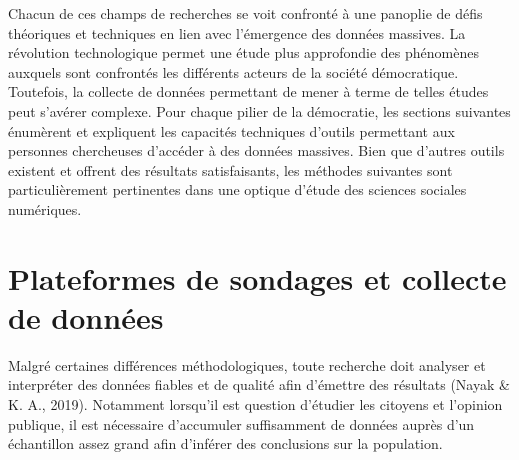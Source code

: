 \documentclass[
  letterpaper,
]{scrbook}
\begin{document}
Chacun de ces champs de recherches se voit confronté à une panoplie de
défis théoriques et techniques en lien avec l'émergence des données
massives. La révolution technologique permet une étude plus approfondie
des phénomènes auxquels sont confrontés les différents acteurs de la
société démocratique. Toutefois, la collecte de données permettant de
mener à terme de telles études peut s'avérer complexe. Pour chaque
pilier de la démocratie, les sections suivantes énumèrent et expliquent
les capacités techniques d'outils permettant aux personnes chercheuses
d'accéder à des données massives. Bien que d'autres outils existent et
offrent des résultats satisfaisants, les méthodes suivantes sont
particulièrement pertinentes dans une optique d'étude des sciences
sociales numériques.

\hypertarget{plateformes-de-sondages-et-collecte-de-donnuxe9es}{%
\section{Plateformes de sondages et collecte de
données}\label{plateformes-de-sondages-et-collecte-de-donnuxe9es}}

Malgré certaines différences méthodologiques, toute recherche doit
analyser et interpréter des données fiables et de qualité afin d'émettre
des résultats (Nayak \& K. A., 2019). Notamment lorsqu'il est question
d'étudier les citoyens et l'opinion publique, il est nécessaire
d'accumuler suffisamment de données auprès d'un échantillon assez grand
afin d'inférer des conclusions sur la population.
\end{document}
